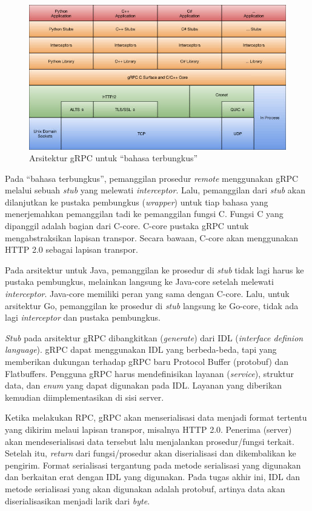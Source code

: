 \begin{figure}
    \centering
    \includegraphics[width=1.0\textwidth]{resources/chapter-2/grpc-arch.jpeg}
    \caption{Arsitektur gRPC untuk ``bahasa terbungkus''
        \parencite{mastrangelo_grpcStack}}
    \label{chapter-2-grpc-stack}
\end{figure}

Pada ``bahasa terbungkus'', pemanggilan prosedur \textit{remote} menggunakan
gRPC me\-la\-lu\-i sebuah \textit{stub} yang me\-le\-wa\-ti
\textit{interceptor}. Lalu, pemanggilan dari \textit{stub} akan dilanjutkan ke
pustaka pembungkus (\textit{wrapper}) untuk tiap bahasa yang
me\-ner\-je\-mah\-kan pemanggilan tadi ke pemanggilan fungsi C. Fungsi C yang
dipanggil adalah bagian dari C-core. C-core pustaka gRPC untuk mengabstraksikan
lapisan transpor. Secara bawaan, C-core akan menggunakan HTTP 2.0 sebagai
lapisan transpor.

Pada arsitektur untuk Java, pemanggilan ke prosedur di \textit{stub} tidak lagi
harus ke pustaka pembungkus, melainkan langsung ke Java-core setelah melewati
\textit{interceptor}. Java-core memiliki peran yang sama dengan C-core. Lalu,
untuk arsitektur Go, pemanggilan ke prosedur di \textit{stub} langsung ke
Go-core, tidak ada lagi \textit{interceptor} dan pustaka pembungkus.

\textit{Stub} pada arsitektur gRPC dibangkitkan (\textit{generate}) dari IDL
(\textit{interface definion language}). gRPC dapat menggunakan IDL yang
berbeda-beda, tapi yang memberikan dukungan terhadap gRPC baru Protocol Buffer
(protobuf) dan Flatbuffers. Pengguna gRPC harus mendefinisikan layanan
(\textit{service}), struktur data, dan \textit{enum} yang dapat digunakan pada
IDL. Layanan yang diberikan kemudian diimplementasikan di sisi server.

Ketika melakukan RPC, gRPC akan menserialisasi data menjadi format tertentu yang
dikirim melaui lapisan transpor, misalnya HTTP 2.0. Penerima (server) akan
mendeserialisasi data tersebut lalu menjalankan prosedur/fungsi terkait. Setelah
itu, \textit{return} dari fungsi/prosedur akan diserialisasi dan dikembalikan ke
pengirim. Format serialisasi tergantung pada metode serialisasi yang digunakan
dan berkaitan erat dengan IDL yang digunakan. Pada tugas akhir ini, IDL dan metode
serialisasi yang akan digunakan adalah protobuf, artinya data akan
diserialisasikan menjadi larik dari \textit{byte}.

